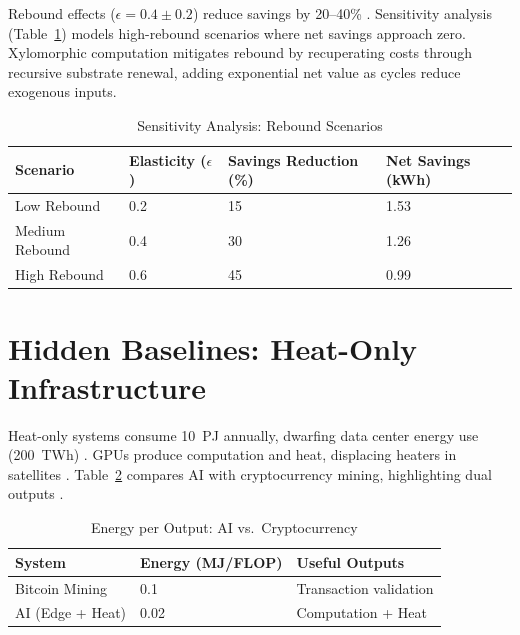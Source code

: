 \documentclass[11pt,a4paper]{article}
\theoremstyle{plain}
\theoremstyle{definition}
\theoremstyle{remark}
\begin{document}
Rebound effects ($\epsilon = 0.4 \pm 0.2$) reduce savings by 20--40\%
\citep{sorrell2009}. Sensitivity analysis (Table~\ref{tab:sensitivity}) models
high-rebound scenarios where net savings approach zero. Xylomorphic computation
mitigates rebound by recuperating costs through recursive substrate renewal,
adding exponential net value as cycles reduce exogenous inputs.

\begin{table}[h]
\centering
\caption{Sensitivity Analysis: Rebound Scenarios}
\label{tab:sensitivity}
\begin{tabular}{llll}
\toprule
Scenario & Elasticity ($\epsilon$) & Savings Reduction (\%) & Net Savings (kWh) \\
\midrule
Low Rebound    & 0.2 & 15 & 1.53 \\
Medium Rebound & 0.4 & 30 & 1.26 \\
High Rebound   & 0.6 & 45 & 0.99 \\
\bottomrule
\end{tabular}
\end{table}

\section{Hidden Baselines: Heat-Only Infrastructure}
\label{sec:heat}

Heat-only systems consume 10~PJ annually, dwarfing data center energy use
(200~TWh) \citep{shehabi2016}. GPUs produce computation and heat, displacing
heaters in satellites \citep{yuan2024}. Table~\ref{tab:aivcrypto} compares AI
with cryptocurrency mining, highlighting dual outputs \citep{odwyer2014}.

\begin{table}[h]
\centering
\caption{Energy per Output: AI vs.\ Cryptocurrency}
\label{tab:aivcrypto}
\begin{tabular}{lll}
\toprule
System & Energy (MJ/FLOP) & Useful Outputs \\
\midrule
Bitcoin Mining   & 0.1  & Transaction validation \\
AI (Edge + Heat) & 0.02 & Computation + Heat     \\
\bottomrule
\end{tabular}
\end{table}

\end{document}
